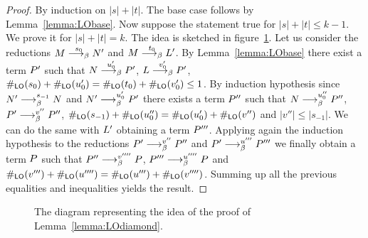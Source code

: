 \begin{proof}
	By induction on $|s|+|t|$. The base case follows by Lemma~\ref{lemma:LObase}. Now suppose the statement true for $|s|+|t|\leq k-1$. We prove it for $|s|+|t|=k$. The idea is sketched in figure~\ref{figure:diagram}.  Let us consider the reductions $M\overset{s_0}{\longrightarrow_\beta}N'$ and $M\overset{t_0}{\longrightarrow_\beta}L'$. By Lemma~\ref{lemma:LObase} there exist a term $P'$ such that $N\overset{u_0'}{\longrightarrow_\beta}P'$, $L\overset{v_0'}{\longrightarrow_\beta}P'$, $\#_{\textsf{LO}}(s_0)+\#_{\textsf{LO}}(u'_0)=\#_{\textsf{LO}}(t_0)+\#_{\textsf{LO}}(v_0')\leq 1$. By induction hypothesis since $N'\longrightarrow^{s_{-1}}_\beta N$ and $N'\longrightarrow^{u'_0}_\beta P'$ there exists a term $P''$ such that $N\longrightarrow^{u''_0}_\beta P''$, $P'\longrightarrow^{v''}_\beta P''$, $\#_{\textsf{LO}}(s_{-1})+\#_{\textsf{LO}}(u''_0)=\#_{\textsf{LO}}(u'_0)+\#_{\textsf{LO}}(v'')$ and $|v''|\leq |s_{-1}|$. We can do the same with $L'$ obtaining a term $P'''$. Applying again the induction hypothesis to the reductions $P'\longrightarrow^{v''}_\beta P''$ and $P'\longrightarrow^{u'''}_\beta P'''$ we finally obtain a term $P$ such that $P''\longrightarrow^{v''''}_\beta P$, $P'''\longrightarrow^{u''''}_\beta P$ and $\#_{\textsf{LO}}(v''')+\#_{\textsf{LO}}(u'''')=\#_{\textsf{LO}}(u''')+\#_{\textsf{LO}}(v'''')$. Summing up all the previous equalities and inequalities yields the result.
\end{proof}
\begin{figure}
	\centering
	\caption{The diagram representing the idea of the proof of Lemma~\ref{lemma:LOdiamond}.}
	\label{figure:diagram}
\end{figure}
